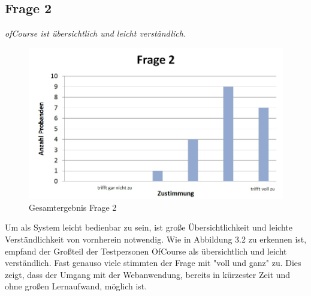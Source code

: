 \subsection{Frage 2}
\begin{center}
	{\it ofCourse ist übersichtlich und leicht verständlich.}
\end{center}
\begin{figure}[h]
\centering
\includegraphics[width=0.7\linewidth]{img/Frage2}
\caption{Gesamtergebnis Frage 2}
\label{fig:Frage2}
\end{figure}
Um als System leicht bedienbar zu sein, ist große Übersichtlichkeit und leichte Verständlichkeit von vornherein notwendig. Wie in Abbildung 3.2 zu erkennen ist, empfand der Großteil der Testpersonen OfCourse als übersichtlich und leicht verständlich. Fast genauso viele stimmten der Frage mit "voll und ganz" zu. Dies zeigt, dass der Umgang mit der Webanwendung, bereits in kürzester Zeit und ohne großen Lernaufwand, möglich ist.

